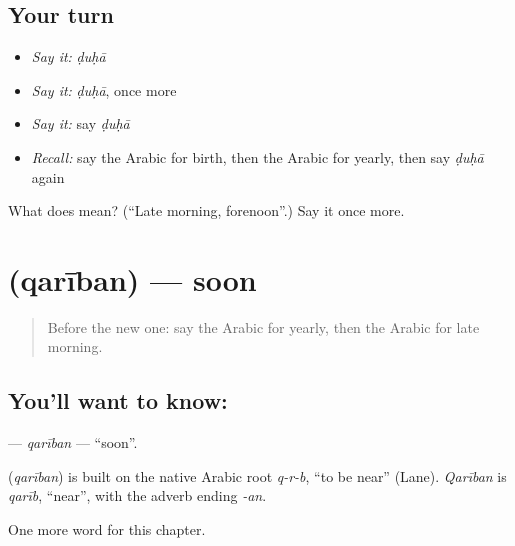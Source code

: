 \subsection*{Your turn}
\begin{itemize}
\raggedright
  \item \emph{Say it:} \emph{ḍuḥā}
  \item \emph{Say it:} \emph{ḍuḥā}, once more
  \item \emph{Say it:} say \emph{ḍuḥā}
  \item \emph{Recall:} say the Arabic for birth, then the Arabic for yearly, then say \emph{ḍuḥā} again
\end{itemize}

\begin{tcolorbox}[breakable,colback=teal!4,colframe=teal!35!black,title={Before you move on}]
What does  mean? (\textquotedblleft{}Late morning, forenoon\textquotedblright{}.) Say it once more.
\end{tcolorbox}
\section[\texorpdfstring{\ar{قريبا} (qarīban)}{قريبا (qarīban)}]{ (qarīban) — soon}

\label{lesson:AR-C234-qariban}



\begin{quote}
Before the new one: say the Arabic for yearly, then the Arabic for late morning.
\end{quote}

\subsection*{You'll want to know: }
\textbf{} — \emph{qarīban} — \textquotedblleft{}soon\textquotedblright{}.

\begin{cousinweb}
\textbf{} (\emph{qarīban}) is built on the native Arabic root \emph{q-r-b}, \textquotedblleft{}to be near\textquotedblright{} (Lane). \emph{Qarīban} is \emph{qarīb}, \textquotedblleft{}near\textquotedblright{}, with the adverb ending \emph{-an}.
\end{cousinweb}

\begin{grammarlens}[title={What you've built}]
One more word for this chapter.
\end{grammarlens}

